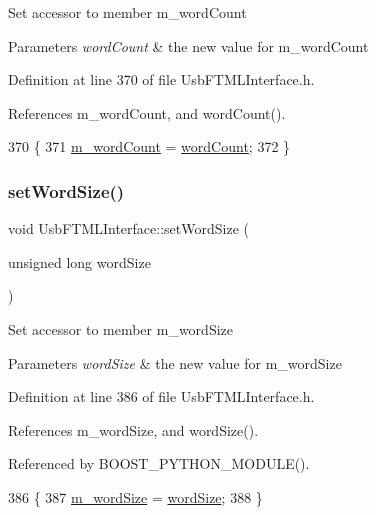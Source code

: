 Set accessor to member m\+\_\+word\+Count 
\begin{DoxyParams}{Parameters}
{\em word\+Count} & the new value for m\+\_\+word\+Count \\
\hline
\end{DoxyParams}


Definition at line 370 of file Usb\+F\+T\+M\+L\+Interface.\+h.



References m\+\_\+word\+Count, and word\+Count().


\begin{DoxyCode}
370                                               \{
371     \hyperlink{classUsbFTMLInterface_ab7f4399ef367c08ffe1f7034f133986e}{m\_wordCount} = \hyperlink{classUsbFTMLInterface_a844ab72bfe0d3e14dd16f607a7c14905}{wordCount};
372   \}
\end{DoxyCode}
\mbox{\label{classUsbFTMLInterface_a8f54e893ac36ae74bd4702ae649b79dd}} 
\subsubsection{\texorpdfstring{set\+Word\+Size()}{setWordSize()}}
{\footnotesize\ttfamily void Usb\+F\+T\+M\+L\+Interface\+::set\+Word\+Size (\begin{DoxyParamCaption}\item[{unsigned long}]{word\+Size }\end{DoxyParamCaption})\hspace{0.3cm}{\ttfamily [inline]}}

Set accessor to member m\+\_\+word\+Size 
\begin{DoxyParams}{Parameters}
{\em word\+Size} & the new value for m\+\_\+word\+Size \\
\hline
\end{DoxyParams}


Definition at line 386 of file Usb\+F\+T\+M\+L\+Interface.\+h.



References m\+\_\+word\+Size, and word\+Size().



Referenced by B\+O\+O\+S\+T\+\_\+\+P\+Y\+T\+H\+O\+N\+\_\+\+M\+O\+D\+U\+L\+E().


\begin{DoxyCode}
386                                             \{
387     \hyperlink{classUsbFTMLInterface_a39a8dfbe54cc29e033fa2a4d5fbbc982}{m\_wordSize} = \hyperlink{classUsbFTMLInterface_ac313f412cbda6222ef817cb46083e2b3}{wordSize};
388   \}
\end{DoxyCode}
\mbox{\label{classUsbFTMLInterface_ab9ff3b850ed592872bd82c579052114f}} 
